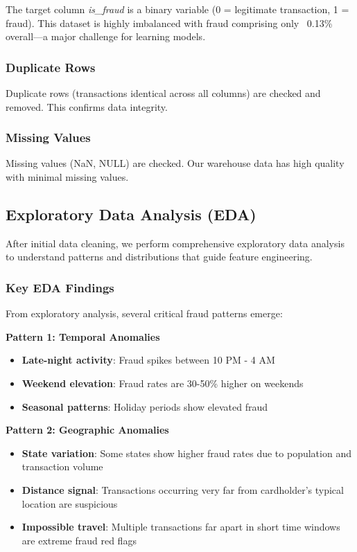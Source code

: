 The target column \textit{is\_fraud} is a binary variable (0 = legitimate transaction, 1 = fraud). This dataset is highly imbalanced with fraud comprising only ~0.13\% overall---a major challenge for learning models.

\subsubsection{Duplicate Rows}

Duplicate rows (transactions identical across all columns) are checked and removed. This confirms data integrity.

\subsubsection{Missing Values}

Missing values (NaN, NULL) are checked. Our warehouse data has high quality with minimal missing values.

\subsection{Exploratory Data Analysis (EDA)}

After initial data cleaning, we perform comprehensive exploratory data analysis to understand patterns and distributions that guide feature engineering.

\subsubsection{Key EDA Findings}

From exploratory analysis, several critical fraud patterns emerge:

\textbf{Pattern 1: Temporal Anomalies}
\begin{itemize}
    \item \textbf{Late-night activity}: Fraud spikes between 10 PM - 4 AM
    \item \textbf{Weekend elevation}: Fraud rates are 30-50\% higher on weekends
    \item \textbf{Seasonal patterns}: Holiday periods show elevated fraud
\end{itemize}

\textbf{Pattern 2: Geographic Anomalies}
\begin{itemize}
    \item \textbf{State variation}: Some states show higher fraud rates due to population and transaction volume
    \item \textbf{Distance signal}: Transactions occurring very far from cardholder's typical location are suspicious
    \item \textbf{Impossible travel}: Multiple transactions far apart in short time windows are extreme fraud red flags
\end{itemize}

